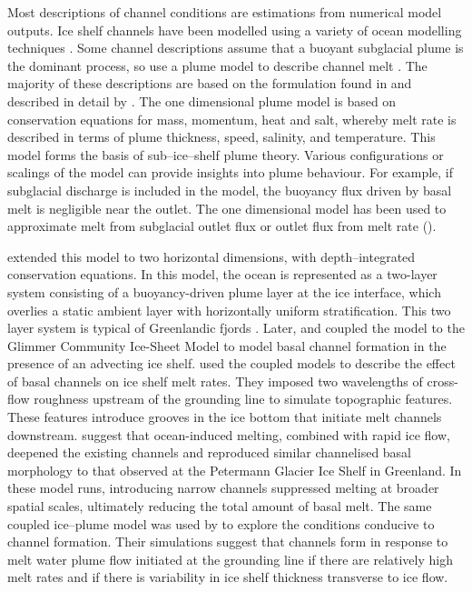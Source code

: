 Most descriptions of channel conditions are estimations from numerical model outputs.
Ice shelf channels have been modelled using a variety of ocean modelling techniques  \citep[e.g.][]{millgate2013effect,gladish2012ice,sergienko2013basal,payne2007numerical}. 
Some channel descriptions assume that a buoyant subglacial plume is the dominant process, so use a plume model to describe channel melt \citep[e.g.][]{gladish2012ice, sergienko2013basal}.
The majority of these descriptions are based on the formulation found in \cite{jenkins2011convection} and described in detail by \cite{hewitt2020subglacial}.
The \cite{jenkins2011convection} one dimensional plume model is based on conservation equations for mass, momentum, heat and salt, whereby melt rate is described in terms of plume thickness, speed, salinity, and temperature. This model forms the basis of sub--ice--shelf plume theory. Various configurations or scalings of the model can provide insights into plume behaviour. For example, if subglacial discharge is included in the model, the buoyancy flux driven by basal melt is negligible near the outlet. The one dimensional model has been used to approximate melt from subglacial outlet flux \cite[e.g.][]{gourmelen2017channelized} or outlet flux from melt rate (\cite[e.g.][]{marsh2016high}).

\cite{holland2006effects} extended this model to two horizontal dimensions, with depth--integrated conservation equations. In this model, the ocean is represented as a two-layer system consisting of a buoyancy-driven plume layer at the ice interface, which overlies a static  ambient layer with horizontally uniform stratification. This two layer system is typical of Greenlandic fjords \citep{hewitt2020subglacial}.
Later, \cite{gladish2012ice,dallaston2015channelization} and \cite{sergienko2013regular} coupled the model to the Glimmer Community Ice-Sheet Model \citep{rutt2009glimmer} to model basal channel formation in the presence of an advecting ice shelf.
\cite{gladish2012ice} used the coupled models to describe the effect of basal channels on ice shelf melt rates. They imposed two wavelengths of cross-flow  roughness upstream of the grounding line to simulate topographic features. These features introduce grooves in the ice bottom that initiate melt channels downstream. \cite{gladish2012ice} suggest that ocean-induced melting, combined with rapid ice flow, deepened the existing channels and reproduced similar channelised basal morphology to that observed at the Petermann Glacier Ice Shelf in Greenland. In these model runs, introducing narrow channels suppressed melting at broader spatial scales, ultimately reducing the total amount of basal melt.
The same coupled ice--plume model was used by \cite{sergienko2013basal} to explore the conditions conducive to channel formation.  Their simulations suggest that channels form in response to melt water plume flow initiated at the grounding line if there are relatively high melt rates and if there is variability in ice shelf thickness transverse to ice flow.


